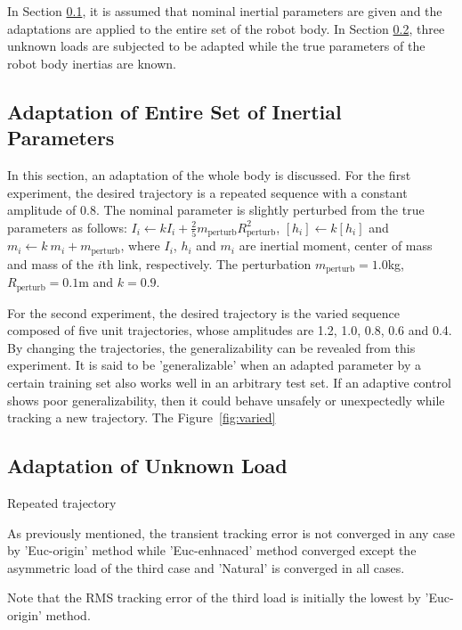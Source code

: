 \documentclass[letterpaper, 10 pt, conference]{ieeeconf}  %
\begin{document}
In Section \ref{section:entire}, it is assumed that nominal inertial parameters are given and the adaptations are applied to the entire set of the robot body. In Section \ref{section:EFonly}, three unknown loads are subjected to be adapted while the true parameters of the robot body inertias are known.


\subsection{Adaptation of Entire Set of Inertial Parameters} \label{section:entire}
In this section, an adaptation of the whole body is discussed. For the first experiment, the desired trajectory is a repeated sequence with a constant amplitude of 0.8. The nominal parameter is slightly perturbed from the true parameters as follows: $I_i \leftarrow k I_i + \frac{2}{5}m_{\text{perturb}}R_{\text{perturb}}^2$, $[h_i]\leftarrow k [h_i] $ and $m_i \leftarrow k ~m_i + m_{\text{perturb}}$, where $I_i$, $h_i$ and $m_i$ are inertial moment, center of mass and mass of the $i$th link, respectively. The perturbation $m_{\text{perturb}}=1.0$kg, $R_{\text{perturb}}=0.1$m and $k=0.9$. 

For the second experiment, the desired trajectory is the varied sequence composed of five unit trajectories, whose amplitudes are 1.2, 1.0, 0.8, 0.6 and 0.4. By changing the trajectories, the generalizability can be revealed from this experiment. It is said to be 'generalizable' when an adapted parameter by a certain training set also works well in an arbitrary test set. If an adaptive control shows poor generalizability, then it could behave unsafely or unexpectedly while tracking a new trajectory. The Figure~\ref{fig:varied}



\subsection{Adaptation of Unknown Load} \label{section:EFonly}
Repeated trajectory

As previously mentioned, the transient tracking error is not converged in any case by 'Euc-origin' method while 'Euc-enhnaced' method converged except the asymmetric load of the third case and 'Natural' is converged in all cases. 

Note that the RMS tracking error of the third load is initially the lowest by 'Euc-origin' method.

\end{document}
